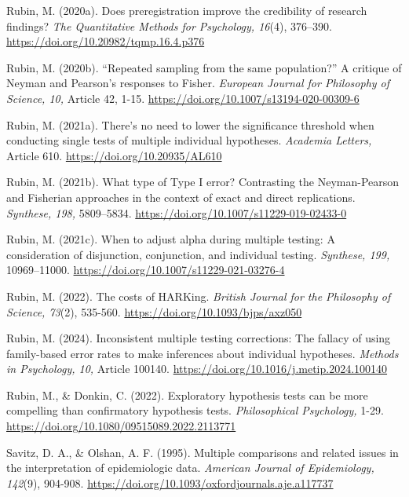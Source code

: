 \documentclass[authordate, meta]{jote-new-article}
\begin{document}
	Rubin, M. (2020a). Does preregistration improve the credibility of research findings? \emph{The Quantitative Methods for Psychology, 16}(4), 376--390. \url{https://doi.org/10.20982/tqmp.16.4.p376}



	Rubin, M. (2020b). “Repeated sampling from the same population?” A critique of Neyman and Pearson's responses to Fisher. \emph{European Journal for Philosophy of Science, 10,} Article 42, 1-15. \url{https://doi.org/10.1007/s13194-020-00309-6}



	Rubin, M. (2021a). There's no need to lower the significance threshold when conducting single tests of multiple individual hypotheses. \emph{Academia Letters,} Article 610. \url{https://doi.org/10.20935/AL610}



	Rubin, M. (2021b). What type of Type I error? Contrasting the Neyman-Pearson and Fisherian approaches in the context of exact and direct replications. \emph{Synthese, 198,} 5809--5834. \url{https://doi.org/10.1007/s11229-019-02433-0}



	Rubin, M. (2021c). When to adjust alpha during multiple testing: A consideration of disjunction, conjunction, and individual testing. \emph{Synthese, 199,} 10969--11000. \url{https://doi.org/10.1007/s11229-021-03276-4}



	Rubin, M. (2022). The costs of HARKing. \emph{British Journal for the Philosophy of Science, 73}(2), 535-560. \url{https://doi.org/10.1093/bjps/axz050}



	Rubin, M. (2024). Inconsistent multiple testing corrections: The fallacy of using family-based error rates to make inferences about individual hypotheses. \emph{Methods in Psychology, 10, }Article 100140. \url{https://doi.org/10.1016/j.metip.2024.100140}



	Rubin, M., \& Donkin, C. (2022). Exploratory hypothesis tests can be more compelling than confirmatory hypothesis tests. \emph{Philosophical Psychology, }1-29. \url{https://doi.org/10.1080/09515089.2022.2113771}



	Savitz, D. A., \& Olshan, A. F. (1995). Multiple comparisons and related issues in the interpretation of epidemiologic data. \emph{American Journal of Epidemiology, 142}(9), 904-908. \url{https://doi.org/10.1093/oxfordjournals.aje.a117737}
\end{document}
